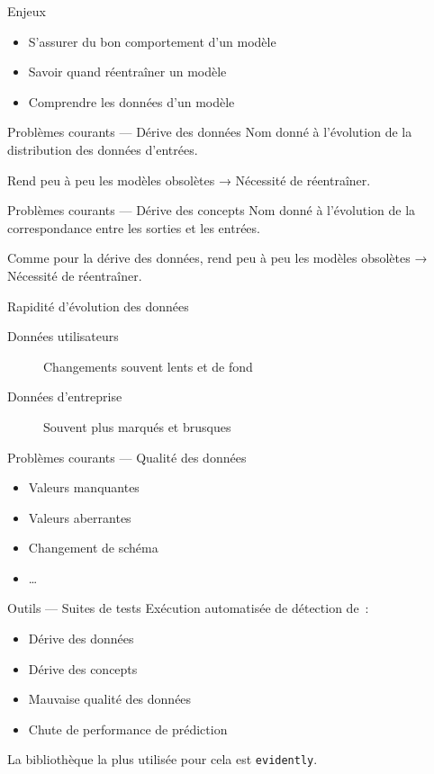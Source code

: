 \begin{frame}{Enjeux}
  \begin{itemize}
    \item S'assurer du bon comportement d'un modèle
    \item Savoir quand réentraîner un modèle
    \item Comprendre les données d'un modèle
  \end{itemize}
\end{frame}

\begin{frame}{Problèmes courants — Dérive des données}
  Nom donné à l'évolution de la distribution des données d'entrées.

  Rend peu à peu les modèles obsolètes → Nécessité de réentraîner.
\end{frame}

\begin{frame}{Problèmes courants — Dérive des concepts}
  Nom donné à l'évolution de la correspondance entre les sorties et les entrées.

  Comme pour la dérive des données, rend peu à peu les modèles obsolètes → Nécessité de réentraîner.
\end{frame}

\begin{frame}{Rapidité d'évolution des données}
  \begin{description}
    \item[Données utilisateurs] Changements souvent lents et de fond
    \item[Données d'entreprise] Souvent plus marqués et brusques
  \end{description}
\end{frame}

\begin{frame}{Problèmes courants — Qualité des données}
  \begin{itemize}
    \item Valeurs manquantes
    \item Valeurs aberrantes
    \item Changement de schéma
    \item …
  \end{itemize}
\end{frame}

\begin{frame}{Outils — Suites de tests}
  Exécution automatisée de détection de~:
  \begin{itemize}
    \item Dérive des données
    \item Dérive des concepts
    \item Mauvaise qualité des données
    \item Chute de performance de prédiction
  \end{itemize}
  La bibliothèque la plus utilisée pour cela est \texttt{evidently}.
\end{frame}

